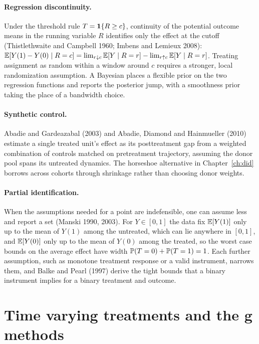 \paragraph{Regression discontinuity.} Under the threshold rule $T=\mathbf{1}\{R\ge c\}$, continuity of the potential outcome means in the running variable $R$ identifies only the effect at the cutoff (Thistlethwaite and Campbell 1960; Imbens and Lemieux 2008): $\mathbb{E}[Y(1)-Y(0)\mid R=c]=\lim_{r\downarrow c}\mathbb{E}[Y\mid R=r]-\lim_{r\uparrow c}\mathbb{E}[Y\mid R=r]$. Treating assignment as random within a window around $c$ requires a stronger, local randomization assumption. A Bayesian places a flexible prior on the two regression functions and reports the posterior jump, with a smoothness prior taking the place of a bandwidth choice.

\paragraph{Synthetic control.} Abadie and Gardeazabal (2003) and Abadie, Diamond and Hainmueller (2010) estimate a single treated unit's effect as its posttreatment gap from a weighted combination of controls matched on pretreatment trajectory, assuming the donor pool spans its untreated dynamics. The horseshoe alternative in Chapter~\ref{ch:did} borrows across cohorts through shrinkage rather than choosing donor weights.

\paragraph{Partial identification.} When the assumptions needed for a point are indefensible, one can assume less and report a set (Manski 1990, 2003). For $Y\in[0,1]$ the data fix $\mathbb{E}[Y(1)]$ only up to the mean of $Y(1)$ among the untreated, which can lie anywhere in $[0,1]$, and $\mathbb{E}[Y(0)]$ only up to the mean of $Y(0)$ among the treated, so the worst case bounds on the average effect have width $\mathbb{P}(T=0)+\mathbb{P}(T=1)=1$. Each further assumption, such as monotone treatment response or a valid instrument, narrows them, and Balke and Pearl (1997) derive the tight bounds that a binary instrument implies for a binary treatment and outcome.

\section{Time varying treatments and the g methods}\label{fw:sec:gmethods}

